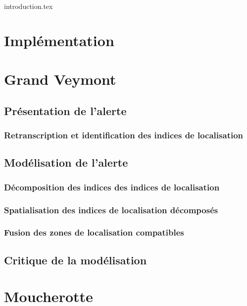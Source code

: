 
\chaptertoc{}

{introduction.tex}

\section{Implémentation}
\label{sec:9-1}


\section{Grand Veymont}
\label{sec:9-1}

\subsection{Présentation de l'alerte}
\label{subsec:9-1-1}

\subsubsection{Retranscription et identification des indices de localisation}
\label{subsec:9-1-1-1}

\subsection{Modélisation de l'alerte}
\label{subsec:9-1-2}


\subsubsection{Décomposition des indices des indices de localisation}
\label{subsec:9-1-2-2}

\subsubsection{Spatialisation des indices de localisation décomposés}
\label{subsec:9-1-2-3}

\subsubsection{Fusion des zones de localisation compatibles}
\label{subsec:9-1-2-4}

\subsection{Critique de la modélisation}
\label{subsec:9-1-3}


\section{Moucherotte}
\label{sec:9-2}

